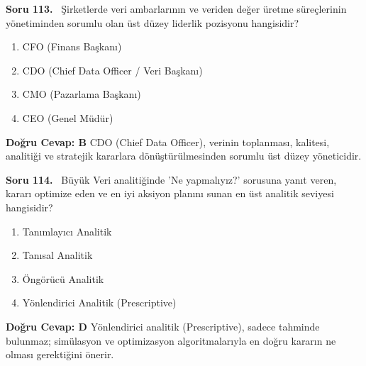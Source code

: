 \documentclass[11pt,a4paper,openany]{book}
\begin{document}
\needspace{5cm}
\vspace{8pt}
\noindent\textbf{\large\sffamily Soru 113.} \ Şirketlerde veri ambarlarının ve veriden değer üretme süreçlerinin yönetiminden sorumlu olan üst düzey liderlik pozisyonu hangisidir?
\begin{enumerate}[label=\Alph*), leftmargin=25pt, topsep=4pt, itemsep=2pt]
    \item CFO (Finans Başkanı)
    \item CDO (Chief Data Officer / Veri Başkanı)
    \item CMO (Pazarlama Başkanı)
    \item CEO (Genel Müdür)
\end{enumerate}
\vspace{4pt}
\begin{tcolorbox}[title=Cevap ve Açıklama, colback=gray!3!white, colframe=primarycolor!90!black, arc=2mm, fonttitle=\bfseries\sffamily, top=6pt, bottom=6pt]
    \textbf{Doğru Cevap: B}
    \vspace{2pt}
    CDO (Chief Data Officer), verinin toplanması, kalitesi, analitiği ve stratejik kararlara dönüştürülmesinden sorumlu üst düzey yöneticidir.
\end{tcolorbox}
\vspace{10pt}

\needspace{5cm}
\vspace{8pt}
\noindent\textbf{\large\sffamily Soru 114.} \ Büyük Veri analitiğinde 'Ne yapmalıyız?' sorusuna yanıt veren, kararı optimize eden ve en iyi aksiyon planını sunan en üst analitik seviyesi hangisidir?
\begin{enumerate}[label=\Alph*), leftmargin=25pt, topsep=4pt, itemsep=2pt]
    \item Tanımlayıcı Analitik
    \item Tanısal Analitik
    \item Öngörücü Analitik
    \item Yönlendirici Analitik (Prescriptive)
\end{enumerate}
\vspace{4pt}
\begin{tcolorbox}[title=Cevap ve Açıklama, colback=gray!3!white, colframe=primarycolor!90!black, arc=2mm, fonttitle=\bfseries\sffamily, top=6pt, bottom=6pt]
    \textbf{Doğru Cevap: D}
    \vspace{2pt}
    Yönlendirici analitik (Prescriptive), sadece tahminde bulunmaz; simülasyon ve optimizasyon algoritmalarıyla en doğru kararın ne olması gerektiğini önerir.
\end{tcolorbox}
\vspace{10pt}
\end{document}
